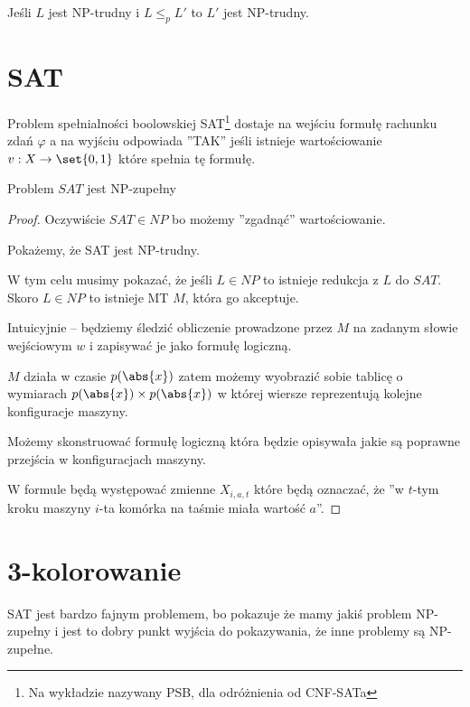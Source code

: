 \begin{lemma}
    Jeśli \( L \) jest NP-trudny i \( L \leq_p L' \) to \( L' \) jest NP-trudny. 
\end{lemma}



\section{SAT}

\begin{definition}
    Problem spełnialności boolowskiej SAT\footnote{Na wykładzie nazywany PSB, dla odróżnienia od CNF-SATa} dostaje na wejściu formułę rachunku zdań \( \varphi \) a na wyjściu odpowiada ''TAK'' jeśli istnieje wartościowanie \( v: X \rightarrow \set{0, 1} \) które spełnia tę formułę.
\end{definition}

\begin{theorem}
    Problem \( SAT \) jest NP-zupełny
\end{theorem}
\begin{proof}
    Oczywiście \(SAT \in NP\) bo możemy ''zgadnąć'' wartościowanie.
    
    Pokażemy, że SAT jest NP-trudny.
    
    W tym celu musimy pokazać, że jeśli \( L \in NP \) to istnieje redukcja z \( L \) do \( SAT \).
    Skoro \( L \in NP \) to istnieje MT \( M \), która go akceptuje. 
    
    Intuicyjnie -- będziemy śledzić obliczenie prowadzone przez \( M \) na zadanym słowie wejściowym \( w \) i zapisywać je jako formułę logiczną.
    
    \( M \) działa w czasie \( p(\abs{x}) \) zatem możemy wyobrazić sobie tablicę o wymiarach \( p(\abs{x}) \times p(\abs{x}) \) w której wiersze reprezentują kolejne konfiguracje maszyny.

    Możemy skonstruować formułę logiczną która będzie opisywała jakie są poprawne przejścia w konfiguracjach maszyny.
    
    W formule będą występować zmienne \( X_{i, a, t} \) które będą oznaczać, że ''w \( t \)-tym kroku maszyny \( i \)-ta komórka na taśmie miała wartość \( a \)''.
\end{proof}


\section{3-kolorowanie}
SAT jest bardzo fajnym problemem, bo pokazuje że mamy jakiś problem NP-zupełny i jest to dobry punkt wyjścia do pokazywania, że inne problemy są NP-zupełne.

